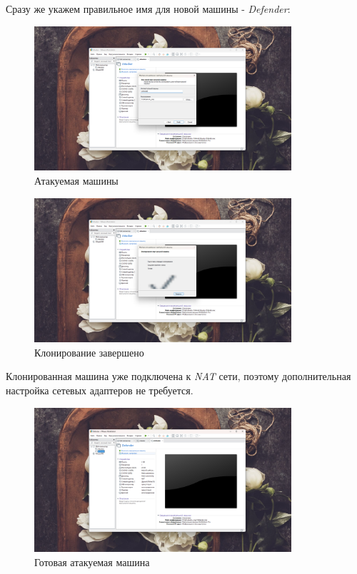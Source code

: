 \documentclass[a4paper]{article}
\begin{document}
  Сразу же укажем правильное имя для новой машины - \textit{Defender}:

  \begin{figure}[H]
    \centering
    \includegraphics[width=0.85\textwidth]{03_00 (18)}
    \caption{Атакуемая машины}
    \label{img:18}
  \end{figure}

  \begin{figure}[H]
    \centering
    \includegraphics[width=0.85\textwidth]{03_00 (19)}
    \caption{Клонирование завершено}
    \label{img:19}
  \end{figure}

  Клонированная машина уже подключена к \textit{NAT} сети, поэтому дополнительная
  настройка сетевых адаптеров не требуется.

  \begin{figure}[H]
    \centering
    \includegraphics[width=0.85\textwidth]{03_00 (20)}
    \caption{Готовая атакуемая машина}
    \label{img:20}
  \end{figure}
\end{document}
